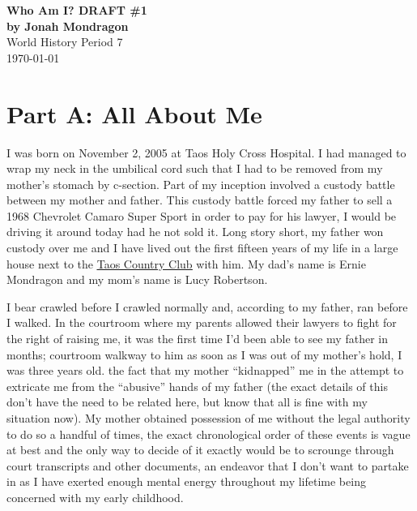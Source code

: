 \documentclass[12pt]{article}
\begin{document}
\doublespacing

\begin{titlepage}
    \begin{center}
        \vspace*{1.5in}
        {\huge\bfseries{Who Am I? DRAFT \#1}}\\
            {\bfseries{by Jonah Mondragon}}\\
            World History Period 7\\
            \today
    \end{center}
\end{titlepage}

\section*{Part A: All About Me}

I was born on November 2, 2005 at Taos Holy Cross Hospital.  I had managed to
wrap my neck in the umbilical cord such that I had to be removed from my
mother's stomach by c-section.  Part of my inception involved a custody battle
between my mother and father.  This custody battle forced my father to sell a
1968 Chevrolet Camaro Super Sport in order to pay for his lawyer, I would be
driving it around today had he not sold it.  Long story short, my father won
custody over me and I have lived out the first fifteen years of my life in a
large house next to the {\color{blue}
\underline{\href{https://www.taoscountryclub.com/}{Taos Country Club}}} with
him. My dad's name is Ernie Mondragon and my mom's name is Lucy Robertson.

I bear crawled before I crawled normally and, according to my father, ran
before I walked.  In the courtroom where my parents allowed their lawyers to
fight for the right of raising me, it was the first time I'd been able to see
my father in months; %
courtroom walkway to him as soon as I was out of my mother's hold, I was three
years old. %
the fact that my mother ``kidnapped'' me in the attempt to extricate me from
the ``abusive'' hands of my father (the exact details of this don't have the
need to be related here, but know that all is fine with my situation now).  My
mother obtained possession of me without the legal authority to do so a handful
of times, the exact chronological order of these events is vague at best and
the only way to decide of it exactly would be to scrounge through court
transcripts and other documents, an endeavor that I don't want to partake in as
I have exerted enough mental energy throughout my lifetime being concerned with
my early childhood.
\end{document}
